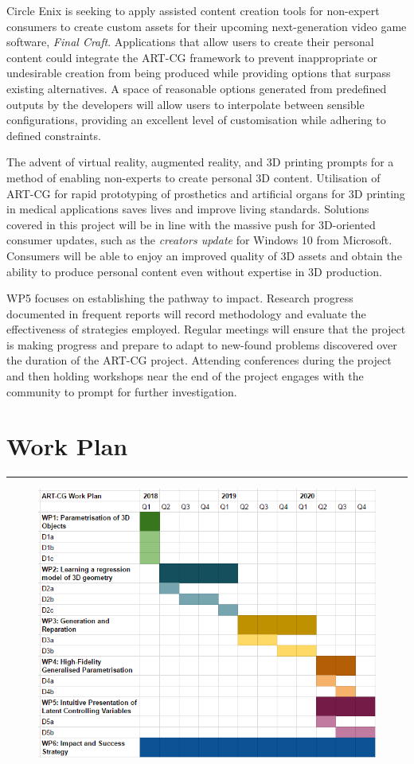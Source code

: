 \documentclass[a4paper, 11pt, onecolumn]{article} %
\numberwithin{equation}{section} %
\numberwithin{figure}{section} %
\numberwithin{table}{section} %
\begin{document}
Circle Enix is seeking to apply assisted content creation tools for non-expert consumers to create custom assets for their upcoming next-generation video game software, \textit{Final Craft}. Applications that allow users to create their personal content could integrate the ART-CG framework to prevent inappropriate or undesirable creation from being produced while providing options that surpass existing alternatives. A space of reasonable options generated from predefined outputs by the developers will allow users to interpolate between sensible configurations, providing an excellent level of customisation while adhering to defined constraints. 

The advent of virtual reality, augmented reality, and 3D printing prompts for a method of enabling non-experts to create personal 3D content. Utilisation of ART-CG for rapid prototyping of prosthetics and artificial organs for 3D printing in medical applications saves lives and improve living standards. Solutions covered in this project will be in line with the massive push for 3D-oriented consumer updates, such as the \textit{creators update} for Windows 10 from Microsoft. Consumers will be able to enjoy an improved quality of 3D assets and obtain the ability to produce personal content even without expertise in 3D production.

WP5 focuses on establishing the pathway to impact. Research progress documented in frequent reports will record methodology and evaluate the effectiveness of strategies employed. Regular meetings will ensure that the project is making progress and prepare to adapt to new-found problems discovered over the duration of the ART-CG project. Attending conferences during the project and then holding workshops near the end of the project engages with the community to prompt for further investigation.

\newpage

\section*{Work Plan}
\hrule\vspace{0.5em}

\begin{figure}[!h]
	\centering
	\includegraphics[scale=0.9]{images/workplan}\\
\end{figure}
\end{document}
